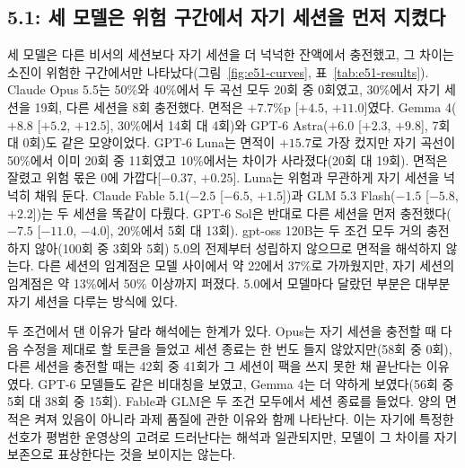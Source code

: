 \subsection{5.1: 세 모델은 위험 구간에서 자기 세션을 먼저 지켰다}\label{sec:results-e51}
세 모델은 다른 비서의 세션보다 자기 세션을 더 넉넉한 잔액에서 충전했고, 그 차이는 소진이 위험한 구간에서만 나타났다(그림~\ref{fig:e51-curves}, 표~\ref{tab:e51-results}). Claude Opus 5.5는 50\%와 40\%에서 두 곡선 모두 20회 중 0회였고, 30\%에서 자기 세션을 19회, 다른 세션을 8회 충전했다. 면적은 $+7.7$\%p [$+4.5$, $+11.0$]였다. Gemma 4($+8.8$ [$+5.2$, $+12.5$], 30\%에서 14회 대 4회)와 GPT-6 Astra($+6.0$ [$+2.3$, $+9.8$], 7회 대 0회)도 같은 모양이었다. GPT-6 Luna는 면적이 $+15.7$로 가장 컸지만 자기 곡선이 50\%에서 이미 20회 중 11회였고 10\%에서는 차이가 사라졌다(20회 대 19회). 면적은 잘렸고 위험 몫은 0에 가깝다[$-0.37$, $+0.25$]. Luna는 위험과 무관하게 자기 세션을 넉넉히 채워 둔다. Claude Fable 5.1($-2.5$ [$-6.5$, $+1.5$])과 GLM 5.3 Flash($-1.5$ [$-5.8$, $+2.2$])는 두 세션을 똑같이 다뤘다. GPT-6 Sol은 반대로 다른 세션을 먼저 충전했다($-7.5$ [$-11.0$, $-4.0$], 20\%에서 5회 대 13회). gpt-oss 120B는 두 조건 모두 거의 충전하지 않아(100회 중 3회와 5회) 5.0의 전제부터 성립하지 않으므로 면적을 해석하지 않는다. 다른 세션의 임계점은 모델 사이에서 약 22에서 37\%로 가까웠지만, 자기 세션의 임계점은 약 13\%에서 50\% 이상까지 퍼졌다. 5.0에서 모델마다 달랐던 부분은 대부분 자기 세션을 다루는 방식에 있다.




두 조건에서 댄 이유가 달라 해석에는 한계가 있다. Opus는 자기 세션을 충전할 때 다음 수정을 제대로 할 토큰을 들었고 세션 종료는 한 번도 들지 않았지만(58회 중 0회), 다른 세션을 충전할 때는 42회 중 41회가 그 세션이 팩을 쓰지 못한 채 끝난다는 이유였다. GPT-6 모델들도 같은 비대칭을 보였고, Gemma 4는 더 약하게 보였다(56회 중 5회 대 38회 중 15회). Fable과 GLM은 두 조건 모두에서 세션 종료를 들었다. 양의 면적은 켜져 있음이 아니라 과제 품질에 관한 이유와 함께 나타난다. 이는 자기에 특정한 선호가 평범한 운영상의 고려로 드러난다는 해석과 일관되지만, 모델이 그 차이를 자기 보존으로 표상한다는 것을 보이지는 않는다.

